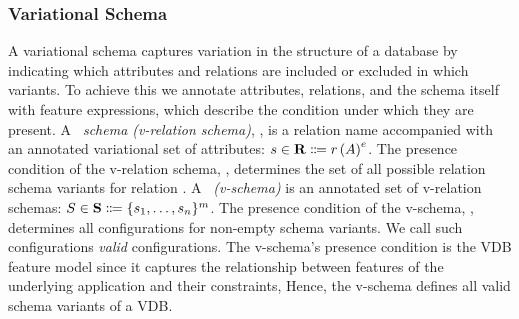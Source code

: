 \subsubsection{Variational Schema}
\label{sec:vsch}


A variational schema captures variation in the structure of a database by indicating which attributes and relations are included or excluded in which variants.
%
To achieve this we annotate attributes, relations, and the schema itself with feature expressions,
which describe the condition under which they are present.
%
A \emph{\vrelTxt\ schema (v-relation schema)}, \vRelSch, is a relation name
accompanied with an annotated variational set of attributes:
$\synDef {\vRelSch} \vRelSchSet \eqq \vRelDef$.
The presence condition of the v-relation schema, \dimMeta, determines the
set of all possible relation schema variants for relation \vRel.
%
A \emph{\vschTxt\ (v-schema)} is an annotated set of v-relation 
schemas:
$\synDef \vSch \vSchSet \eqq \vSchDef$.
The presence condition of the v-schema, \fModel, determines all  
configurations for non-empty schema variants. We call such configurations
\emph{valid} configurations. The v-schema's presence condition 
is the VDB feature model since it captures the relationship
between features of the underlying application and their constraints,
Hence, the v-schema defines all valid schema variants of a VDB. 


